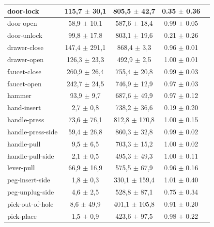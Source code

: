 \documentclass{article}
\theoremstyle{plain}
\theoremstyle{definition}
\theoremstyle{remark}
\begin{document}
\begin{table}[H]
{\begin{tabular}{|l|c|c|c|c|}
door-lock                 & 115,7 $\pm$ 30,1  & 805,5 $\pm$ 42,7  &               0.35 $\pm$ 0.36     \\ \hline
door-open                 & 58,9 $\pm$ 10,1   & 587,6 $\pm$ 18,4  &               0.99 $\pm$ 0.05     \\ \hline
door-unlock               & 99,8 $\pm$ 17,8   & 803,1 $\pm$ 19,6  &               0.21 $\pm$ 0.26     \\ \hline
drawer-close              & 147,4 $\pm$ 291,1 & 868,4 $\pm$ 3,3   &               0.96 $\pm$ 0.01     \\ \hline
drawer-open               & 126,3 $\pm$ 23,3  & 492,9 $\pm$ 2,5   &               1.00 $\pm$ 0.01     \\ \hline
faucet-close              & 260,9 $\pm$ 26,4  & 755,4 $\pm$ 20,8  &               0.99 $\pm$ 0.03     \\ \hline
faucet-open               & 242,7 $\pm$ 24,5  & 746,9 $\pm$ 12,9  &               0.97 $\pm$ 0.03     \\ \hline
hammer                    & 93,9 $\pm$ 9,7    & 687,6 $\pm$ 49,9  &               0.97 $\pm$ 0.12     \\ \hline
hand-insert               & 2,7 $\pm$ 0,8     & 738,2 $\pm$ 36,6  &               0.19 $\pm$ 0.20     \\ \hline
handle-press              & 73,6 $\pm$ 76,1   & 812,8 $\pm$ 170,8 &               1.00 $\pm$ 0.15     \\ \hline
handle-press-side         & 59,4 $\pm$ 26,8   & 860,3 $\pm$ 32,8  &               0.99 $\pm$ 0.02     \\ \hline
handle-pull               & 9,5 $\pm$ 6,5     & 703,3 $\pm$ 15,2  &               1.00 $\pm$ 0.02     \\ \hline
handle-pull-side          & 2,1 $\pm$ 0,5     & 495,3 $\pm$ 49,3  &               1.00 $\pm$ 0.11     \\ \hline
lever-pull                & 66,9 $\pm$ 16,9   & 575,5 $\pm$ 67,9  &               0.96 $\pm$ 0.16     \\ \hline
peg-insert-side           & 1,8 $\pm$ 0,3     & 330,1 $\pm$ 159,4 &               1.01 $\pm$ 0.40     \\ \hline
peg-unplug-side           & 4,6 $\pm$ 2,5     & 528,8 $\pm$ 87,1  &               0.75 $\pm$ 0.34     \\ \hline
pick-out-of-hole          & 8,6 $\pm$ 49,9    & 401,1 $\pm$ 105,8 &               0.91 $\pm$ 0.20     \\ \hline
pick-place                & 1,5 $\pm$ 0,9     & 423,6 $\pm$ 97,5  &               0.98 $\pm$ 0.22     \\ \hline

\end{tabular}}
\end{table}
\end{document}
